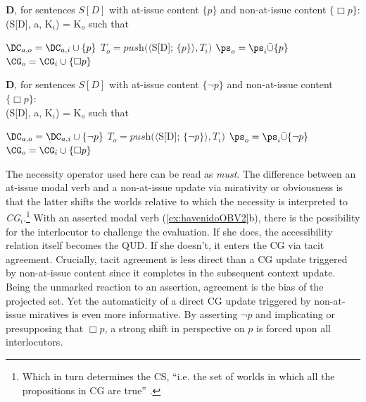 \begin{exe}
\ex\label{ex:declarativeoperatorrevised2indicativeOBV} \textbf{D}, for sentences $S[D]$ with at-issue content $\{ p \}$ and non-at-issue content $\{ \Box p \}$:\\
	(S[D], a, K$_{i}$) = K$_{o}$ such that 
	\begin{xlist}
		\ex $\DC_{a,o} = \DC_{a,i}\cup \{ p \}$ 
		\ex $T_{o} = \textit{push}(\langle$S[D]; $\{ p \}\rangle, T_{i})$
		\ex $\ps_{o} = \ps_{i}\bar{\cup}\{ p \}$ 
		\ex $\CG_{o} = \CG_{i} \cup \{ \Box p \}$
	\end{xlist}

\ex\label{ex:declarativeoperatorrevised2indicativeMIR} \textbf{D}, for sentences $S[D]$ with at-issue content $\lbrace\neg p \rbrace$ and non-at-issue content $\{ \Box p \}$:\\
	(S[D], a, K$_{i}$) = K$_{o}$ such that 
	\begin{xlist}
		\ex $\DC_{a,o} = \DC_{a,i}\cup \lbrace\neg p \rbrace$ 
		\ex $T_{o} = \textit{push}(\langle$S[D]; $\lbrace\neg p \rbrace\rangle, T_{i})$
		\ex $\ps_{o} = \ps_{i}\bar{\cup}\lbrace\neg p \rbrace$ 
		\ex $\CG_{o} = \CG_{i} \cup \{ \Box p \}$
	\end{xlist}
\end{exe}

The necessity operator used here can be read as \textit{must}. The difference between an at-issue modal verb and a non-at-issue update via mirativity or obviousness is that the latter shifts the worlds relative to which the necessity is interpreted to \textit{CG}$_i$.\footnote{Which in turn determines the \ac{CS}, ``i.e. the set of worlds in which all the propositions in CG are true'' \citep[208]{Roberts.20042006}.} With an asserted modal verb (\ref{ex:havenidoOBV2}b), there is the possibility for the interlocutor to challenge the evaluation. If she does, the accessibility relation itself becomes the \ac{QUD}. If she doesn't, it enters the \ac{CG} via tacit agreement. Crucially, tacit agreement is less direct than a \ac{CG} update triggered by non-at-issue content since it completes in the subsequent context update. Being the unmarked reaction to an assertion, agreement is the bias of the projected set. Yet the automaticity of a direct \ac{CG} update triggered by non-at-issue miratives is even more informative. By asserting $\neg p$ and implicating or presupposing that $\Box p$, a strong shift in perspective on $p$ is forced upon all interlocutors.

